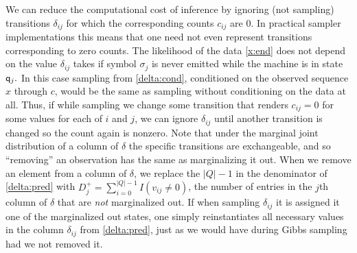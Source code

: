 We can reduce the computational cost of inference by ignoring (not sampling) transitions $\delta_{ij}$ for which the corresponding counts $c_{ij}$ are 0.  In practical sampler implementations this means that one need not even represent transitions corresponding to zero counts.  The likelihood of the data \eqref{x:end} does not depend on the value $\delta_{ij}$ takes if symbol $\sigma_j$ is never emitted while the machine is in state $\q_j.$   In this case sampling from \eqref{delta:cond}, conditioned on the observed sequence $x$ through $c$, would be the same as sampling without conditioning on the data at all.  Thus, if while sampling we change some transition that renders $c_{ij}=0$ for some values for each of $i$ and $j$, we can ignore $\delta_{ij}$ until another transition is changed so the count again is nonzero.  Note that under the marginal joint distribution of a column of $\delta$ the specific transitions are exchangeable, and so ``removing'' an observation has the same as marginalizing it out.  
When we remove an element from a column of $\delta$, we replace the $|Q| - 1$ in the denominator of \eqref{delta:pred} with $D^+_j = \sum_{i=0}^{|Q|-1}I(v_{ij}\neq0)$, the number of entries in the $j$th column of $\delta$ that are {\em not} marginalized out.
If when sampling $\delta_{ij}$ it is assigned it one of the marginalized out states, one simply reinstantiates all necessary values in the column  $\delta_{ij}$ from \eqref{delta:pred}, just as we would have during Gibbs sampling had we not removed it.  
 




